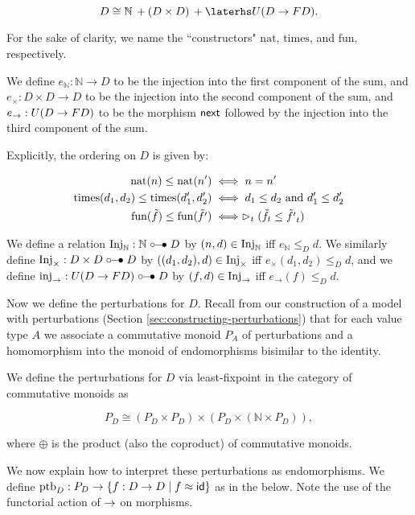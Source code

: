 \[ D \cong \mathbb{N}\, + (D \times D)\, + \laterhs U(D \arr FD). \]


For the sake of clarity, we name the ``constructors" $\text{nat}$, $\text{times}$,
and $\text{fun}$, respectively.

We define $e_\mathbb{N} : \mathbb{N} \to D$ to be the injection into the first
component of the sum, and $e_\times : D \times D \to D$ to be the injection into
the second component of the sum, and $e_\to : U(D \to F D)$ to be the morphism
$\mathsf{next}$ followed by the injection into the third component of the sum.

Explicitly, the ordering on $D$ is given by:

\begin{align*}
    \text{nat}(n) \le \text{nat}(n') 
        &\iff n = n' \\
    \text{times} (d_1, d_2) \le \text{times} (d_1', d_2')
        &\iff d_1 \le d_2 \text{ and } d_1' \le d_2'\\
    \text{fun}(\tilde{f}) \le \text{fun}(\tilde{f'}) 
        &\iff \vartriangleright_t(\tilde{f}_t \le \tilde{f'}_t)
\end{align*}

We define a relation $\text{Inj}_\mathbb{N} : \mathbb{N} \mathrel{\circ\mkern-6mu-\mkern-6mu\bullet} D$ by
$(n, d) \in \text{Inj}_\mathbb{N}$ iff $e_\mathbb{N} \le_D d$.
We similarly define $\text{Inj}_\times : D \times D \mathrel{\circ\mkern-6mu-\mkern-6mu\bullet} D$ by
$((d_1, d_2), d) \in \text{Inj}_\times$ iff $e_\times(d_1, d_2) \le_D d$,
and we define $\text{inj}_\to : U(D \to F D) \mathrel{\circ\mkern-6mu-\mkern-6mu\bullet} D$ by
$(f, d) \in \text{Inj}_\to$ iff $e_\to(f) \le_D d$.

Now we define the perturbations for $D$.
Recall from our construction of a model with perturbations
(Section \ref{sec:constructing-perturbations}) that for each value
type $A$ we associate a commutative monoid $P_A$ of perturbations
and a homomorphism into the monoid of endomorphisms bisimilar to the identity.

We define the perturbations for $D$ via least-fixpoint in the category of
commutative monoids as

\[ P_D \cong (P_D \times P_D) \times (P_D \times (\mathbb{N} \times P_D)), \]

where $\oplus$ is the product (also the coproduct) of commutative monoids.

We now explain how to interpret these perturbations as endomorphisms.
We define $\text{ptb}_D : P_D \to \{ f : D \to D \mid f \approx \mathsf{id} \}$ as in the below.
Note the use of the functorial action of $\to$ on morphisms.

